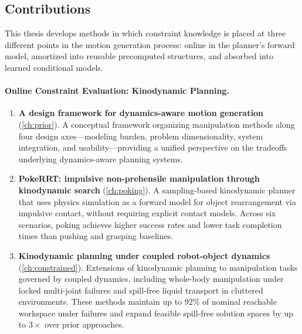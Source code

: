 
\subsection{Contributions}
\label{sec:intro:contributions}

This thesis develops methods in which constraint knowledge is placed at three different points in the motion generation process: online in the planner's forward model, amortized into reusable precomputed structures, and absorbed into learned conditional models.

\paragraph{Online Constraint Evaluation: Kinodynamic Planning.}
\begin{enumerate}
  \item \textbf{A design framework for dynamics-aware motion generation} (\cref{ch:prior}).
        A conceptual framework organizing manipulation methods along four design axes---modeling burden, problem dimensionality, system integration, and usability---providing a unified perspective on the tradeoffs underlying dynamics-aware planning systems.

  \item \textbf{PokeRRT: impulsive non-prehensile manipulation through kinodynamic search} (\cref{ch:poking}).
        A sampling-based kinodynamic planner that uses physics simulation as a forward model for object rearrangement via impulsive contact, without requiring explicit contact models.
        Across six scenarios, poking achieves higher success rates and lower task completion times than pushing and grasping baselines.

  \item \textbf{Kinodynamic planning under coupled robot-object dynamics} (\cref{ch:constrained}).
        Extensions of kinodynamic planning to manipulation tasks governed by coupled dynamics, including whole-body manipulation under locked multi-joint failures and spill-free liquid transport in cluttered environments.
        These methods maintain up to 92\% of nominal reachable workspace under failures and expand feasible spill-free solution spaces by up to $3\times$ over prior approaches.
\end{enumerate}

